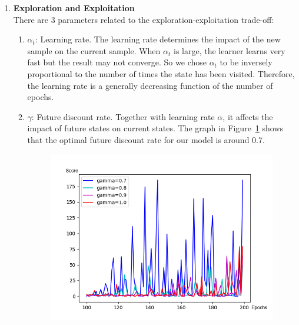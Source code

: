 \documentclass[11pt]{article}
\begin{document}
\begin{enumerate}
        \item \textbf{Exploration and Exploitation}\\
        There are 3 parameters related to the exploration-exploitation trade-off:
          \begin{enumerate}
            \item $\alpha_t$: Learning rate. The learning rate determines the impact of the new sample on the current sample. When $\alpha_t$ is large, the learner learns very fast but the result may not converge. So we chose $\alpha_t$ to be inversely proportional to the number of times the state has been visited. Therefore, the learning rate is a generally decreasing function of the number of epochs.
            \item $\gamma$: Future discount rate. Together with learning rate $\alpha$, it affects the impact of future states on current states. The graph in Figure~\ref{fig:Gamma} shows that the optimal future discount rate for our model is around 0.7.
            \begin{figure}[htbp]
            \centering
            \begin{minipage}{.49\textwidth}
            \centering
            \includegraphics[width=\textwidth]{gamma.png}
            \label{fig:Gamma}
            \end{minipage}
            \begin{minipage}{.49\textwidth}
            \centering

\end{minipage}
\end{figure}
\end{enumerate}
\end{enumerate}
\end{document}

